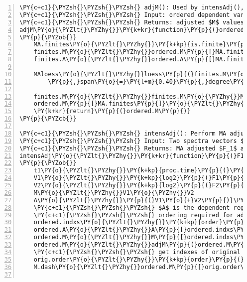 \begin{Verbatim}[commandchars=\\\{\},codes={\catcode`\$=3\catcode`\^=7\catcode`\_=8},gobble=0,numbers=left,fontfamily=fvm,fontshape=n,fontsize=\footnotesize,tabsize=2]
\PY{c+c1}{\PYZsh{}\PYZsh{}\PYZsh{} adjM(): Used by intensAdj(), performs LOESS regression on ordered MA\PYZhy{}vals}
\PY{c+c1}{\PYZsh{}\PYZsh{}\PYZsh{} Input: ordered dependent variable $A$ with corresponding $M$}
\PY{c+c1}{\PYZsh{}\PYZsh{}\PYZsh{} Returns: adjusted $M$ values, $M_t^*$}
adjM\PY{o}{\PYZlt{}\PYZhy{}}\PY{k+kr}{function}\PY{p}{(}ordered.M\PY{p}{,}ordered.A\PY{p}{)}
\PY{p}{\PYZob{}}
	MA.finites\PY{o}{\PYZlt{}\PYZhy{}}\PY{k+kp}{is.finite}\PY{p}{(}ordered.M\PY{p}{)} \PY{c+c1}{\PYZsh{}only include values $>-\infty$}
	finites.M\PY{o}{\PYZlt{}\PYZhy{}}ordered.M\PY{p}{[}MA.finites\PY{p}{]}
	finites.A\PY{o}{\PYZlt{}\PYZhy{}}ordered.A\PY{p}{[}MA.finites\PY{p}{]}
	
	MAloess\PY{o}{\PYZlt{}\PYZhy{}}loess\PY{p}{(}finites.M\PY{o}{\PYZti{}}finites.A
		\PY{p}{,}span\PY{o}{=}\PY{l+m}{0.40}\PY{p}{,}degree\PY{o}{=}\PY{l+m}{2}\PY{p}{,}family\PY{o}{=}\PY{l+s}{\PYZdq{}}\PY{l+s}{symmetric\PYZdq{}}\PY{p}{,}normalize\PY{o}{=}\PY{k+kc}{FALSE}\PY{p}{)}

	finites.M\PY{o}{\PYZlt{}\PYZhy{}}finites.M\PY{o}{\PYZhy{}}MAloess\PY{o}{\PYZdl{}}fitted \PY{c+c1}{\PYZsh{} make adjustments }
	ordered.M\PY{p}{[}MA.finites\PY{p}{]}\PY{o}{\PYZlt{}\PYZhy{}}finites.M \PY{c+c1}{\PYZsh{} and return adjusted values}
	\PY{k+kr}{return}\PY{p}{(}ordered.M\PY{p}{)}
\PY{p}{\PYZcb{}}	

\PY{c+c1}{\PYZsh{}\PYZsh{}\PYZsh{} intensAdj(): Perform MA adjustment on two vectors}
\PY{c+c1}{\PYZsh{}\PYZsh{}\PYZsh{} Input: Two spectra vectors $F_1$ and $F_2$}
\PY{c+c1}{\PYZsh{}\PYZsh{}\PYZsh{} Returns: MA adjusted $F_1$ and $F_2$ values, $F_1^*$ and $F_2^*$ respectively}
intensAdj\PY{o}{\PYZlt{}\PYZhy{}}\PY{k+kr}{function}\PY{p}{(}F1\PY{p}{,}F2\PY{p}{)}
\PY{p}{\PYZob{}}
	t1\PY{o}{\PYZlt{}\PYZhy{}}\PY{k+kp}{proc.time}\PY{p}{(}\PY{p}{)}\PY{p}{[}\PY{l+m}{3}\PY{p}{]} \PY{c+c1}{\PYZsh{}\PYZsh{}\PYZsh{} get start time}
	V1\PY{o}{\PYZlt{}\PYZhy{}}\PY{k+kp}{log2}\PY{p}{(}F1\PY{p}{)} \PY{c+c1}{\PYZsh{} Will produce $-\infty$ for $\log_2(0)$}
	V2\PY{o}{\PYZlt{}\PYZhy{}}\PY{k+kp}{log2}\PY{p}{(}F2\PY{p}{)}
	M\PY{o}{\PYZlt{}\PYZhy{}}V1\PY{o}{\PYZhy{}}V2
	A\PY{o}{\PYZlt{}\PYZhy{}}\PY{p}{(}V1\PY{o}{+}V2\PY{p}{)}\PY{o}{/}\PY{l+m}{2}
	\PY{c+c1}{\PYZsh{}\PYZsh{}\PYZsh{} $A$ is the dependent regression variable,}
	\PY{c+c1}{\PYZsh{}\PYZsh{}\PYZsh{} ordering required for adjM function}
	ordered.indxs\PY{o}{\PYZlt{}\PYZhy{}}\PY{k+kp}{order}\PY{p}{(}A\PY{p}{)}
	ordered.A\PY{o}{\PYZlt{}\PYZhy{}}A\PY{p}{[}ordered.indxs\PY{p}{]}
	ordered.M\PY{o}{\PYZlt{}\PYZhy{}}M\PY{p}{[}ordered.indxs\PY{p}{]}
	ordered.M\PY{o}{\PYZlt{}\PYZhy{}}adjM\PY{p}{(}ordered.M\PY{p}{,}ordered.A\PY{p}{)}
	\PY{c+c1}{\PYZsh{}\PYZsh{}\PYZsh{} get indexes of original ordering}
	orig.order\PY{o}{\PYZlt{}\PYZhy{}}\PY{k+kp}{order}\PY{p}{(}ordered.indxs\PY{p}{)}
	M.dash\PY{o}{\PYZlt{}\PYZhy{}}ordered.M\PY{p}{[}orig.order\PY{p}{]}
	

\end{Verbatim}
